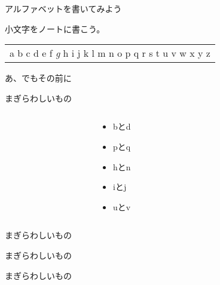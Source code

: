 \documentclass[aspectratio=169,xcolor={dvipsnames,table}]{beamer}
\begin{document}
\begin{frame}[plain,label=write_lower]{アルファベットを書いてみよう}
\LARGE

小文字をノートに書こう。

\bigskip
\begin{rmfamily}
\begin{tabular}{p{}}
a b c d e f {\itshape g} h i j k l m n o p q r s t u v w x y z
\end{tabular}
\end{rmfamily}\pause

\bigskip

あ、でもその前に
\end{frame}
\begin{frame}[plain]{まぎらわしいもの}
\Huge

\begin{columns}
\begin{column}{.3\textwidth}
\end{column}
\begin{column}{.35\textwidth}
\begin{itemize}[<+->]
 \item b{\LARGE と}d
 \item p{\LARGE と}q
 \item h{\LARGE と}n
 \item i{\LARGE と}j
 \item u{\LARGE と}v
\end{itemize}
\end{column}
\begin{column}{.3\textwidth}
\end{column}
\end{columns}
\end{frame}
\begin{frame}[plain]{まぎらわしいもの}
 
 \Huge
\centering

\end{frame}
\begin{frame}[plain]{まぎらわしいもの}
 
 \Huge
\centering

\end{frame}
\begin{frame}[plain]{まぎらわしいもの}
 
 \Huge
\centering

\end{frame}
\end{document}
